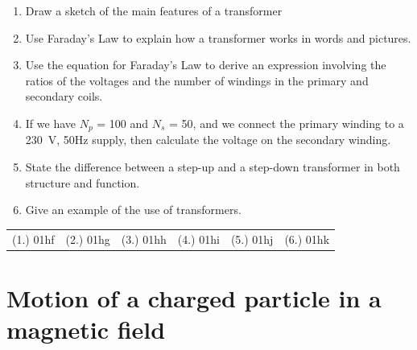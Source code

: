 \begin{enumerate}
\item Draw a sketch of the main features of a transformer
\item Use Faraday's Law to explain how a transformer works in words and pictures.
\item Use the equation for Faraday's Law to derive an expression involving the ratios of the voltages and the number of windings in the primary and secondary coils.
\item If we have $N_p$ = 100 and $N_s$ = 50, and we connect the primary winding to a 230~V, 50Hz supply, then calculate the voltage on the secondary winding.
\item State the difference between a step-up and a step-down transformer in both structure and function.
\item Give an example of the use of transformers.
\end{enumerate}
\par \practiceinfo
\par \begin{tabular}[h]{cccccc}
(1.)	01hf	&
(2.)	01hg	&
(3.)	01hh	&
(4.)	01hi	&
(5.)	01hj	&
(6.)	01hk	 %
\end{tabular}

\section{Motion of a charged particle in a magnetic field}

